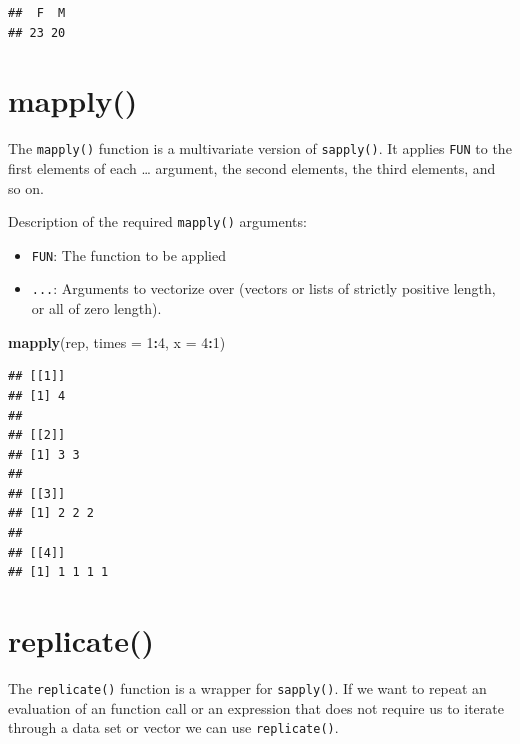 \documentclass[
]{book}
\newenvironment{Shaded}{\begin{snugshade}}{\end{snugshade}}
\newcommand{\DataTypeTok}[1]{\textcolor[rgb]{0.13,0.29,0.53}{#1}}
\newcommand{\DecValTok}[1]{\textcolor[rgb]{0.00,0.00,0.81}{#1}}
\newcommand{\KeywordTok}[1]{\textcolor[rgb]{0.13,0.29,0.53}{\textbf{#1}}}
\newcommand{\NormalTok}[1]{#1}
\newcommand{\OperatorTok}[1]{\textcolor[rgb]{0.81,0.36,0.00}{\textbf{#1}}}
\providecommand{\tightlist}{%
  \setlength{\itemsep}{0pt}\setlength{\parskip}{0pt}}
\begin{document}
\begin{Shaded}
\end{Shaded}

\begin{verbatim}
##  F  M 
## 23 20
\end{verbatim}

\hypertarget{mapply}{%
\section{mapply()}\label{mapply}}

The \texttt{mapply()} function is a multivariate version of \texttt{sapply()}. It applies \texttt{FUN} to the first elements of each \ldots{} argument, the second elements, the third elements, and so on.

Description of the required \texttt{mapply()} arguments:

\begin{itemize}
\tightlist
\item
  \texttt{FUN}: The function to be applied
\item
  \texttt{...}: Arguments to vectorize over (vectors or lists of strictly positive length, or all of zero length).
\end{itemize}

\begin{Shaded}
\begin{Highlighting}[]
\KeywordTok{mapply}\NormalTok{(rep, }\DataTypeTok{times =} \DecValTok{1}\OperatorTok{:}\DecValTok{4}\NormalTok{, }\DataTypeTok{x =} \DecValTok{4}\OperatorTok{:}\DecValTok{1}\NormalTok{)}
\end{Highlighting}
\end{Shaded}

\begin{verbatim}
## [[1]]
## [1] 4
## 
## [[2]]
## [1] 3 3
## 
## [[3]]
## [1] 2 2 2
## 
## [[4]]
## [1] 1 1 1 1
\end{verbatim}

\hypertarget{replicate-1}{%
\section{replicate()}\label{replicate-1}}

The \texttt{replicate()} function is a wrapper for \texttt{sapply()}. If we want to repeat an evaluation of an function call or an expression that does not require us to iterate through a data set or vector we can use \texttt{replicate()}.
\end{document}
